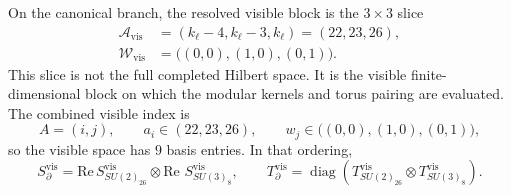 \documentclass[11pt,letterpaper]{article}
\theoremstyle{plain}
\DeclareMathOperator{\diag}{diag}
\newcommand{\kell}{k_{\ell}}
\begin{document}
On the canonical branch, the resolved visible block is the
$3\times3$ slice
\begin{equation}
\label{eq:section-three-visible-slice}
\begin{aligned}
 \mathcal A_{\text{vis}}
 &=
 (\kell-4,\kell-3,\kell)=(22,23,26),\\
 \mathcal W_{\text{vis}}
 &=
 \bigl((0,0),(1,0),(0,1)\bigr).
\end{aligned}
\end{equation}
This slice is not the full completed Hilbert space.  It is the visible
finite-dimensional block on which the modular kernels and torus pairing are
evaluated.  The combined visible index is
\begin{equation}
\label{eq:section-three-visible-index}
 A=(i,j),
 \qquad
 a_i\in(22,23,26),
 \qquad
 w_j\in\bigl((0,0),(1,0),(0,1)\bigr),
\end{equation}
so the visible space has $9$ basis entries.  In that ordering,
\begin{equation}
\label{eq:section-three-code-boundary-matrices}
 S_{\partial}^{\text{vis}}
 =
 \text{Re}\,S_{SU(2)_{26}}^{\text{vis}}
 \otimes
 \text{Re } S_{SU(3)_8}^{\text{vis}},
 \qquad
 T_{\partial}^{\text{vis}}
 =
 \diag\!\left(
 T_{SU(2)_{26}}^{\text{vis}}\otimes T_{SU(3)_8}^{\text{vis}}
 \right).
\end{equation}
\end{document}
